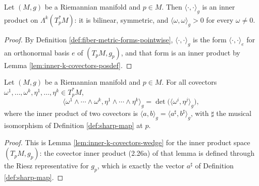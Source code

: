 \begin{lemma}
\label{lem:fiber-metric-forms-inner-product}
\leanok
{}
Let $(M,g)$ be a Riemannian manifold and $p \in M$. Then $\langle \cdot, \cdot \rangle_g$ is an inner product on $\Lambda^k(T_p^*M)$: it is bilinear, symmetric, and $\langle \omega, \omega \rangle_g > 0$ for every $\omega \neq 0$.
\end{lemma}
\begin{proof}
\leanok
{}
By Definition \ref{def:fiber-metric-forms-pointwise}, $\langle \cdot, \cdot \rangle_g$ is the form $\langle \cdot, \cdot \rangle_e$ for an orthonormal basis $e$ of $(T_pM, g_p)$, and that form is an inner product by Lemma \ref{lem:inner-k-covectors-posdef}.
\end{proof}

\begin{lemma}
\label{lem:fiber-metric-forms-wedge}
\leanok
{}
Let $(M,g)$ be a Riemannian manifold and $p \in M$. For all covectors $\omega^1, \ldots, \omega^k, \eta^1, \ldots, \eta^k \in T_p^*M$,
\[
\langle \omega^1 \wedge \cdots \wedge \omega^k, \eta^1 \wedge \cdots \wedge \eta^k \rangle_g = \det\big(\langle \omega^i, \eta^j \rangle_g\big),
\]
where the inner product of two covectors is $\langle a, b \rangle_g = \langle a^\sharp, b^\sharp \rangle_g$, with $\sharp$ the musical isomorphism of Definition \ref{def:sharp-map} at $p$.
\end{lemma}
\begin{proof}
\leanok
{}
This is Lemma \ref{lem:inner-k-covectors-wedge} for the inner product space $(T_pM, g_p)$: the covector inner product (2.26a) of that lemma is defined through the Riesz representative for $g_p$, which is exactly the vector $a^\sharp$ of Definition \ref{def:sharp-map}.
\end{proof}

